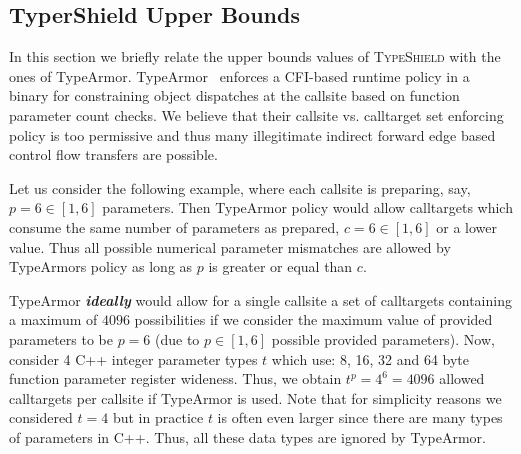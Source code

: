 
\subsection{TyperShield Upper Bounds}
\label{RQ6:TyperArmor's Imprecise Parameter-Count Policy}
\label{Too Permissive Parameter-Based Policies}
In this section we briefly relate the upper bounds values of \textsc{TypeShield} with the ones of TypeArmor.
TypeArmor~\cite{veen:typearmor} enforces a CFI-based runtime policy in a binary for constraining object dispatches at the callsite based on
function parameter count checks.
We believe that their callsite vs. calltarget set enforcing policy is too permissive and thus
many illegitimate indirect forward edge based control flow transfers are possible. 

Let us consider the following example, where each callsite is
preparing, say, $p=6 \in [1, 6]$ parameters. Then TypeArmor policy would allow calltargets which consume the same number of parameters as
prepared, $c=6 \in [1, 6]$ or a lower value. Thus all possible numerical parameter mismatches are allowed by TypeArmors policy as long
as $p$ is greater or equal than $c$.

TypeArmor \textbf{\textit{ideally}} would allow for a single callsite a set of calltargets containing a maximum of $4096$ possibilities if we 
consider the maximum value of provided parameters to be $p=6$ (due to $p \in [1, 6]$ possible provided parameters). Now, consider 4 C++ integer parameter
types $t$ which use: 8, 16, 32 and 64 byte function parameter register wideness. Thus, we obtain $t^{p}=4^{6}=4096$ allowed calltargets per 
callsite if TypeArmor is used. Note that for simplicity reasons we considered $t=4$ but in practice $t$ is often even larger since there are many types
of parameters in C++. Thus, all these data types are ignored by TypeArmor.


